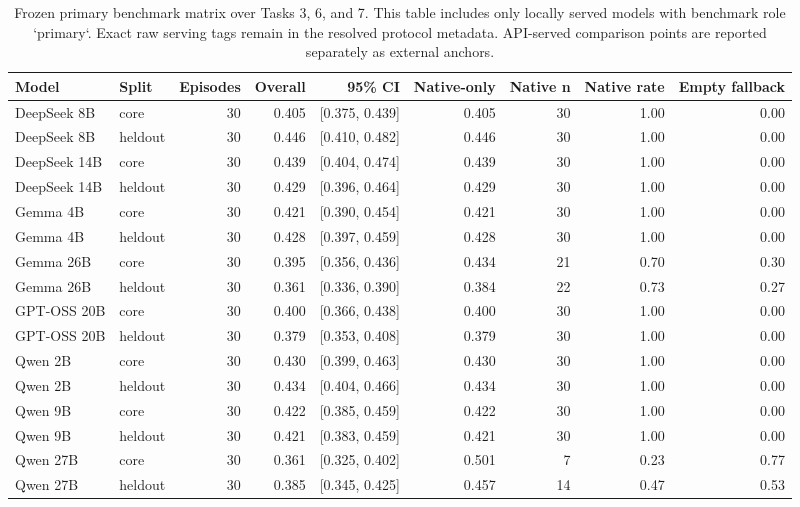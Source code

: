 \begin{table}[t]
  \centering
  \scriptsize
  \setlength{\tabcolsep}{4pt}
  \begin{tabular}{llrrrrrrr}
    \toprule
    Model & Split & Episodes & Overall & 95\% CI & Native-only & Native n & Native rate & Empty fallback \\
    \midrule
    DeepSeek 8B & core & 30 & 0.405 & [0.375, 0.439] & 0.405 & 30 & 1.00 & 0.00 \\
    DeepSeek 8B & heldout & 30 & 0.446 & [0.410, 0.482] & 0.446 & 30 & 1.00 & 0.00 \\
    DeepSeek 14B & core & 30 & 0.439 & [0.404, 0.474] & 0.439 & 30 & 1.00 & 0.00 \\
    DeepSeek 14B & heldout & 30 & 0.429 & [0.396, 0.464] & 0.429 & 30 & 1.00 & 0.00 \\
    Gemma 4B & core & 30 & 0.421 & [0.390, 0.454] & 0.421 & 30 & 1.00 & 0.00 \\
    Gemma 4B & heldout & 30 & 0.428 & [0.397, 0.459] & 0.428 & 30 & 1.00 & 0.00 \\
    Gemma 26B & core & 30 & 0.395 & [0.356, 0.436] & 0.434 & 21 & 0.70 & 0.30 \\
    Gemma 26B & heldout & 30 & 0.361 & [0.336, 0.390] & 0.384 & 22 & 0.73 & 0.27 \\
    GPT-OSS 20B & core & 30 & 0.400 & [0.366, 0.438] & 0.400 & 30 & 1.00 & 0.00 \\
    GPT-OSS 20B & heldout & 30 & 0.379 & [0.353, 0.408] & 0.379 & 30 & 1.00 & 0.00 \\
    Qwen 2B & core & 30 & 0.430 & [0.399, 0.463] & 0.430 & 30 & 1.00 & 0.00 \\
    Qwen 2B & heldout & 30 & 0.434 & [0.404, 0.466] & 0.434 & 30 & 1.00 & 0.00 \\
    Qwen 9B & core & 30 & 0.422 & [0.385, 0.459] & 0.422 & 30 & 1.00 & 0.00 \\
    Qwen 9B & heldout & 30 & 0.421 & [0.383, 0.459] & 0.421 & 30 & 1.00 & 0.00 \\
    Qwen 27B & core & 30 & 0.361 & [0.325, 0.402] & 0.501 & 7 & 0.23 & 0.77 \\
    Qwen 27B & heldout & 30 & 0.385 & [0.345, 0.425] & 0.457 & 14 & 0.47 & 0.53 \\
    \bottomrule
  \end{tabular}
  \caption{Frozen primary benchmark matrix over Tasks 3, 6, and 7. This table
  includes only locally served models with benchmark role `primary`. Exact raw
  serving tags remain in the resolved protocol metadata. API-served comparison
  points are reported separately as external anchors.}
  \label{tab:mainresults}
\end{table}
